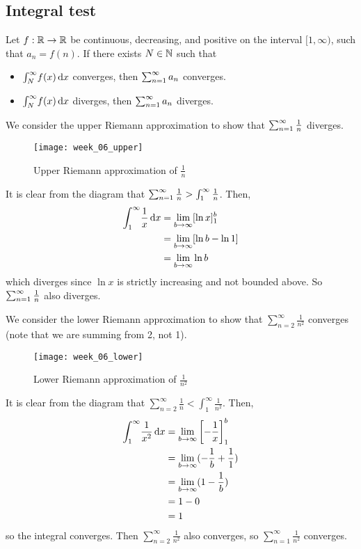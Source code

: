 \subsection{Integral test}
\begin{test}
  Let $f: \mathbb{R} \to \mathbb{R}$ be continuous, decreasing, and positive on the interval $[1, \infty)$, such that $a_n = f(n)$. If there exists $N \in \mathbb{N}$ such that
  \begin{itemize}
    \item $\int_N^\infty\! f(x) \operatorname{d\!} x$ converges, then $\sum_{n = 1} ^ \infty a_n$ converges.
    \item $\int_N^\infty\! f(x) \operatorname{d\!} x$ diverges, then $\sum_{n = 1} ^ \infty a_n$ diverges.
  \end{itemize}
\end{test}
\begin{eg}
  We consider the upper Riemann approximation to show that $\sum_{n = 1} ^ \infty \frac{1}{n}$ diverges.
  \begin{figure}[!htbp]
    \centering
    \texttt{[image: week\_06\_upper]}
    \caption{Upper Riemann approximation of $\frac{1}{n}$}
  \end{figure}
  It is clear from the diagram that $\sum_{n = 1} ^ \infty \frac{1}{n} > \int_1^{\infty} \frac{1}{n}$. Then,
  \begin{align*}
    \int_1^{\infty}\! \frac{1}{x} \di x &= \lim_{b \to \infty} [\ln x]_1^b \\ 
    &= \lim_{b \to \infty} [\ln b - \ln 1] \\ 
    &= \lim_{b \to \infty} \ln b
  \end{align*}
  which diverges since $\ln x$ is strictly increasing and not bounded above. So $\sum_{n = 1} ^ \infty \frac{1}{n}$ also diverges.
\end{eg}
\begin{eg}
  We consider the lower Riemann approximation to show that $\sum_{n = 2}^\infty \frac{1}{n ^ 2}$ converges (note that we are summing from 2, not 1).
  \begin{figure}[!htbp]
    \centering
    \texttt{[image: week\_06\_lower]}
    \caption{Lower Riemann approximation of $\frac{1}{n ^ 2}$}
  \end{figure}
  It is clear from the diagram that $\sum_{n = 2}^\infty \frac{1}{n} < \int_1^{\infty} \frac{1}{n ^ 2}$. Then,
  \begin{align*}
    \int_1^{\infty}\! \frac{1}{x ^ 2} \di x &= \lim_{b \to \infty} \left[-\frac{1}{x}\right]_1^b \\ 
    &= \lim_{b \to \infty} (-\frac{1}{b} + \frac{1}{1}) \\ 
    &= \lim_{b \to \infty} (1 - \frac{1}{b}) \\ 
    &= 1 - 0 \\ 
    &= 1
  \end{align*}
  so the integral converges. Then $\sum_{n = 2}^\infty \frac{1}{n ^ 2}$ also converges, so $\sum_{n = 1}^\infty \frac{1}{n ^ 2}$ converges.
\end{eg}
